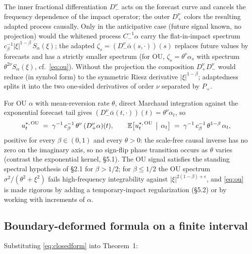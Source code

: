 \documentclass[11pt]{article}
\newcommand{\E}{\mathbb{E}}
\theoremstyle{plain}
\begin{document}
The inner fractional differentiation $D_-^\nu$ acts on the forecast curve and cancels the frequency dependence of the impact operator; the outer $D_+^\nu$ colors the resulting adapted process causally. Only in the anticipative case (future signal known, no projection) would the whitened process $C_-^{-1}\alpha$ carry the flat-in-impact spectrum $c_\beta^{-1}|\xi|^{1-\beta}\,S_\alpha(\xi)$; the adapted $\zeta_s = (D_-^\nu\bar\alpha(s,\cdot))(s)$ replaces future values by forecasts and has a strictly smaller spectrum (for OU, $\zeta_s = \theta^\nu\alpha_s$ with spectrum $\theta^{2\nu}S_\alpha(\xi)$, cf.\ \eqref{eq:ou}). Without the projection the composition $D_+^\nu D_-^\nu$ would reduce (in symbol form) to the symmetric Riesz derivative $|\xi|^{1-\beta}$; adaptedness splits it into the two one-sided derivatives of order $\nu$ separated by $P_+$.

For OU $\alpha$ with mean-reversion rate $\theta$, direct Marchaud integration against the exponential forecast tail gives $(D_-^\nu\bar\alpha(t,\cdot))(t) = \theta^\nu\alpha_t$, so
\begin{equation}\label{eq:ou}
u^{\star,\,\rm OU}_t \;=\; \gamma^{-1}\,c_\beta^{-1}\,\theta^\nu\,(D_+^\nu\alpha)(t), \qquad \E\bigl[u^{\star,\,\rm OU}_t\,\bigm|\,\alpha_t\bigr] \;=\; \gamma^{-1}\,c_\beta^{-1}\,\theta^{1-\beta}\,\alpha_t,
\end{equation}
positive for every $\beta\in(0,1)$ and every $\theta>0$: the scale-free causal inverse has no zero on the imaginary axis, so no sign-flip phase transition occurs as $\theta$ varies (contrast the exponential kernel, \S5.1). The OU signal satisfies the standing spectral hypothesis of \S2.1 for $\beta>1/2$; for $\beta\le 1/2$ the OU spectrum $\sigma^2/(\theta^2+\xi^2)$ fails high-frequency integrability against $|\xi|^{2(1-\beta)+\epsilon}$, and \eqref{eq:ou} is made rigorous by adding a temporary-impact regularization (\S5.2) or by working with increments of $\alpha$.

\subsection{Boundary-deformed formula on a finite interval}

Substituting \eqref{eq:closedform} into Theorem~1:
\end{document}
